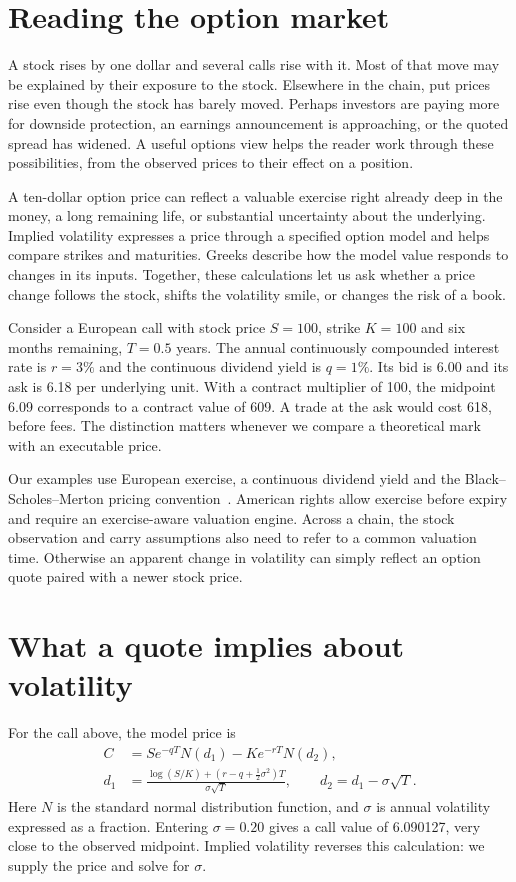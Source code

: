 \documentclass[8pt]{strategynet-journal}
\begin{document}
\begin{SNcolumns}
\section{Reading the option market}
A stock rises by one dollar and several calls rise with it. Most of that move
may be explained by their exposure to the stock. Elsewhere in the chain, put
prices rise even though the stock has barely moved. Perhaps investors are
paying more for downside protection, an earnings announcement is approaching,
or the quoted spread has widened. A useful options view helps the reader work
through these possibilities, from the observed prices to their effect on a
position.

A ten-dollar option price can reflect a valuable exercise right already deep in the money, a long
remaining life, or substantial uncertainty about the underlying. Implied
volatility expresses a price through a specified option model and helps compare
strikes and maturities. Greeks describe how the model value responds to changes
in its inputs. Together, these calculations let us ask whether a price change
follows the stock, shifts the volatility smile, or changes the risk of a book.

Consider a European call with stock price $S=100$, strike $K=100$ and six months
remaining, $T=0.5$ years. The annual continuously compounded interest rate is
$r=3\%$ and the continuous dividend yield is $q=1\%$. Its bid is 6.00 and its ask
is 6.18 per underlying unit. With a contract multiplier of 100, the midpoint
6.09 corresponds to a contract value of 609. A trade at the ask would cost 618,
before fees. The distinction matters whenever we compare a theoretical mark
with an executable price.

Our examples use European exercise, a continuous dividend yield and the
Black--Scholes--Merton pricing convention~\cite{bs,merton}. American rights
allow exercise before expiry and require an exercise-aware valuation engine. Across a chain, the stock observation and carry assumptions also
need to refer to a common valuation time. Otherwise an apparent change in
volatility can simply reflect an option quote paired with a newer stock price.

\section{What a quote implies about volatility}
For the call above, the model price is
\begin{align}
 C&=Se^{-qT}N(d_1)-Ke^{-rT}N(d_2),\\
 d_1&=\frac{\log(S/K)+(r-q+\tfrac12\sigma^2)T}{\sigma\sqrt T},
 \qquad d_2=d_1-\sigma\sqrt T.
\end{align}
Here $N$ is the standard normal distribution function, and $\sigma$ is annual
volatility expressed as a fraction. Entering $\sigma=0.20$ gives a call value of
6.090127, very close to the observed midpoint. Implied volatility reverses this
calculation: we supply the price and solve for $\sigma$.


\end{SNcolumns}
\end{document}
